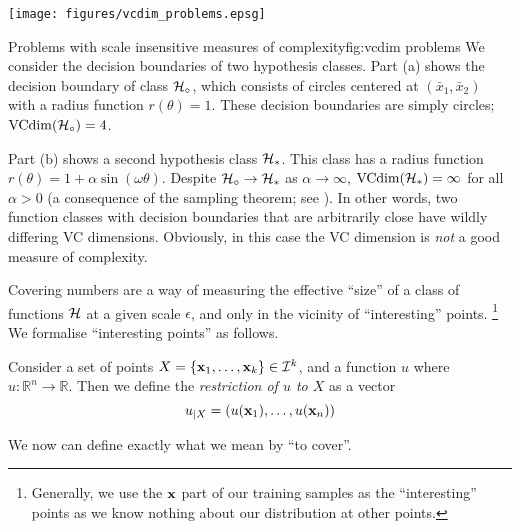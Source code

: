 \begin{linefigure}
\begin{center}
\texttt{[image: figures/vcdim\_problems.epsg]}
\end{center}
\begin{capt}{Problems with scale insensitive measures of
complexity}{fig:vcdim problems}
We consider the decision boundaries of two hypothesis classes.  Part
(a) shows the decision boundary of class $\mathcal{H}_{\circ}$,
which consists of circles centered at $(\bar{x}_1, \bar{x}_2)$ with a
radius function $r(\theta) = 1$.  These decision boundaries are simply
circles; $\mathrm{VCdim}(\mathcal{H}_{\circ}) = 4$.

Part (b) shows a second hypothesis class $\mathcal{H}_{\ast}$.  This class
has a radius function $r(\theta) = 1 + \alpha \sin(\omega \theta)$.
Despite $\mathcal{H}_{\circ} \rightarrow \mathcal{H}_{\ast}$ as $\alpha
\rightarrow \infty$, $\mathrm{VCdim}(\mathcal{H}_{\ast}) = \infty$ for all $\alpha >
0$ (a consequence of the sampling theorem; see \cite{Cherkassky98}).
In other words, two function classes with 
decision boundaries that are arbitrarily close have wildly differing
VC dimensions.  Obviously, in this case the VC dimension is \emph{not} a
good measure of complexity.
\end{capt}
\end{linefigure}

Covering numbers are a way of measuring the effective ``size'' of a
class of functions $\mathcal{H}$ at a given scale $\epsilon$, and only
in the vicinity of ``interesting'' points.%
\footnote{Generally, we use the $\mathbf{x}$ part of our training samples as
the ``interesting'' points as we know nothing about our distribution
at other points.}  We formalise ``interesting points'' as follows.


\begin{definition}
\label{def:restriction}
Consider a set of points $X = \{\mathbf{x}_1, \ldots, \mathbf{x}_k\} \in \mathcal{I}^k$,
and a function $u$ where $u : \mathbb{R}^n \rightarrow \mathbb{R}$.  Then
we define the \emph{restriction of $u$ to $X$} as a vector
%
\begin{equation}
u_{|X} = (u(\mathbf{x}_1), \ldots, u(\mathbf{x}_n))
\end{equation}
\end{definition}

We now can define exactly what we mean by ``to cover''.

